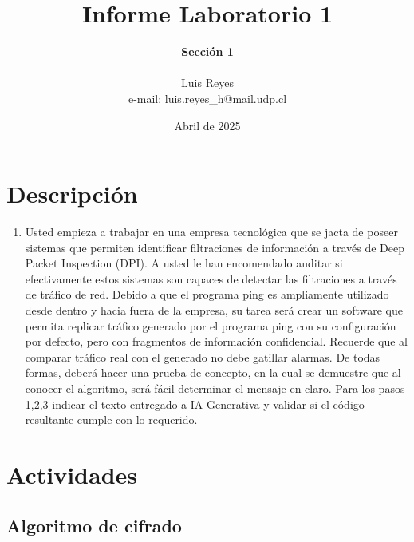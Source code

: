 \documentclass[letter,12pt]{article}
\begin{document}
%
   \title{\Huge{Informe Laboratorio 1}}

   \author{\textbf{Sección 1} \\  \\Luis Reyes \\ e-mail: luis.reyes_h@mail.udp.cl}
          
   \date{Abril de 2025}

   \maketitle
   
   \tableofcontents
 
  \newpage
  

\section{Descripción}

\begin{enumerate}
    \item  Usted empieza a trabajar en una empresa tecnológica que se jacta de poseer sistemas que permiten identificar filtraciones de información a través de Deep Packet Inspection (DPI).
    A usted le han encomendado auditar si efectivamente estos sistemas son capaces de detectar las filtraciones a través de tráfico de red. Debido a que el programa ping es ampliamente utilizado desde dentro y hacia fuera de la empresa, su tarea será crear un software que permita replicar tráfico generado por el programa ping con su configuración por defecto, pero con fragmentos de información confidencial. Recuerde que al comparar tráfico real con el generado no debe gatillar alarmas.
    De todas formas, deberá hacer una prueba de concepto, en la cual se demuestre que al conocer el algoritmo, será fácil determinar el mensaje en claro.
    Para los pasos 1,2,3 indicar el texto entregado a IA Generativa y validar si el código resultante cumple con lo requerido.


\end{enumerate}


\section{Actividades}


\subsection{Algoritmo de cifrado}
\end{document}

